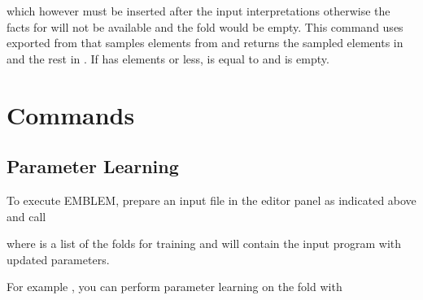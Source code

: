 \documentclass[letterpaper,10pt,english]{sphinxmanual}
\begin{document}
\sphinxAtStartPar
which however must be inserted after the input interpretations otherwise the facts for  will not be available and the fold  would be empty.
This command uses  exported from  that samples  elements from  and returns the sampled elements in  and the rest in .
If  has  elements or less,  is equal to  and  is empty.


\section{Commands}
\label{\detokenize{index:commands}}

\subsection{Parameter Learning}
\label{\detokenize{index:parameter-learning}}
\sphinxAtStartPar
To execute EMBLEM, prepare an input file in the editor panel as indicated above and call

\begin{sphinxVerbatim}[commandchars=\\\{\}]
   
\end{sphinxVerbatim}

\sphinxAtStartPar
where  is a list of the folds for training and  will contain the input program with updated parameters.

\sphinxAtStartPar
For example , you can perform parameter learning on the  fold with

\begin{sphinxVerbatim}[commandchars=\\\{\}]
 \PYG{p}{[}\PYG{p}{]}
\end{sphinxVerbatim}
\end{document}
